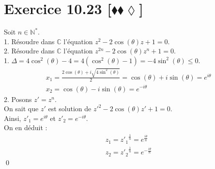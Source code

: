 \documentclass[10pt]{article}
\begin{document}
\section*{Exercice 10.23 [$\blacklozenge\blacklozenge\lozenge$]}
\begin{tcolorbox}[enhanced, width=7in, center, size=fbox, fontupper=\large, drop shadow southwest]
    Soit $n\in\mathbb{N}^*$.\\
    1. Résoudre dans $\mathbb{C}$ l'équation $z^2 - 2\cos(\theta)z + 1 = 0$.\\
    2. Résoudre dans $\mathbb{C}$ l'équation $z^{2n} - 2\cos(\theta)z^n + 1 = 0$.\\
    1. $\Delta = 4\cos^2(\theta)-4=4(\cos^2(\theta)-1)=-4\sin^2(\theta) \leq 0$.
    \begin{align*}
        &x_1 = \frac{2\cos(\theta)+i\sqrt{4\sin^2(\theta)}}{2}=\cos(\theta)+i\sin(\theta)=e^{i\theta}\\
        &x_2 = \cos(\theta) - i\sin(\theta) = e^{-i\theta}
    \end{align*}
    2. Posons $z' = z^n$.\\
    On sait que $z'$ est solution de $z'^2-2\cos(\theta)z'+1=0$.\\
    Ainsi, $z'_1 = e^{i\theta}$ et $z'_2=e^{-i\theta}$.\\
    On en déduit :
    \begin{align*}
        &z_1 = {z'_1}^{\frac{1}{n}}=e^{\frac{i\theta}{n}}\\
        &z_2={z'_2}^{\frac{1}{n}}=e^{-\frac{i\theta}{n}}
    \end{align*}
    \qed
\end{tcolorbox}
\end{document}

